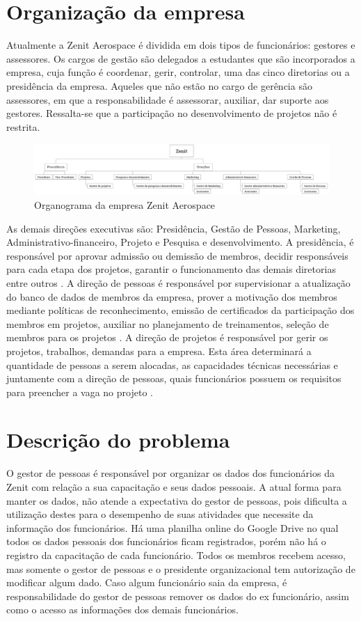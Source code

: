 \section{Organização da empresa}
Atualmente a Zenit Aerospace é dividida em dois tipos de funcionários: gestores e assessores. Os cargos de gestão são delegados a estudantes que são incorporados a empresa, cuja função é coordenar, gerir, controlar, uma das cinco diretorias ou a presidência da empresa. Aqueles que não estão no cargo de gerência são assessores, em que a responsabilidade é assessorar, auxiliar, dar suporte aos gestores. Ressalta-se que a participação no desenvolvimento de projetos não é restrita.
\begin{figure}[h]
	\centering
	\label{zenitOrganograma}
		\includegraphics[keepaspectratio=true,scale=0.3]{figuras/zenitOrganograma.eps}
	\caption{Organograma da empresa Zenit Aerospace}
\end{figure}
As demais direções executivas são: Presidência, Gestão de Pessoas, Marketing, Administrativo-financeiro, Projeto e Pesquisa e desenvolvimento.
A presidência, é responsável por aprovar admissão ou demissão de membros, decidir responsáveis para cada etapa dos projetos, garantir o funcionamento das demais diretorias entre outros \cite{regimentoZenit}. 
A direção de pessoas é responsável por supervisionar a atualização do banco de dados de membros da empresa, prover a motivação dos membros mediante políticas de reconhecimento, emissão de certificados da participação dos membros em projetos, auxiliar no planejamento de treinamentos, seleção de membros para os projetos \cite{regimentoZenit}. 
A direção de projetos é responsável por gerir os projetos, trabalhos, demandas para a empresa. Esta área determinará a quantidade de pessoas a serem alocadas, as capacidades técnicas necessárias e juntamente com a direção de pessoas, quais funcionários possuem os requisitos para preencher a vaga no projeto \cite{regimentoZenit}.

\section[Descrição do problema]{Descrição do problema}
O gestor de pessoas é responsável por organizar os dados dos funcionários da Zenit com relação a sua capacitação e seus dados pessoais. A atual forma para manter os dados, não atende a expectativa do gestor de pessoas, pois dificulta a utilização destes para o desempenho de suas atividades que necessite da informação dos funcionários. Há uma planilha online do Google Drive no qual todos os dados pessoais dos funcionários ficam registrados, porém não há o registro da capacitação de cada funcionário. Todos os membros recebem acesso, mas somente  o gestor de pessoas e o presidente organizacional tem autorização de modificar algum dado. Caso algum funcionário saia da empresa, é responsabilidade do gestor de pessoas remover os dados do ex funcionário, assim como o acesso as informações dos demais funcionários.

